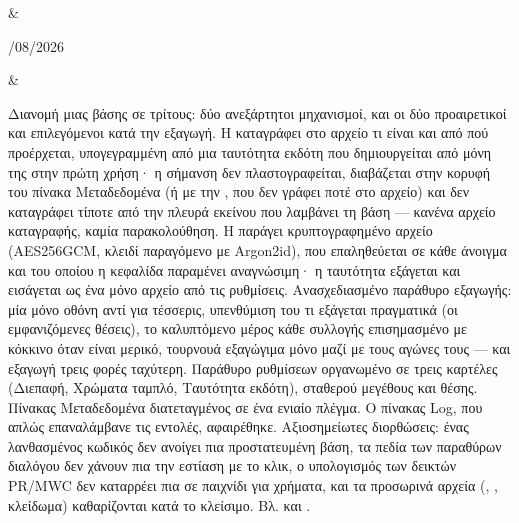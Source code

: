 \documentclass[letterpaper,10pt,greek]{sphinxmanual}
\begin{document}
\begin{savenotes}
\begin{longtable}{}
&\begin{varwidth}[t]{}
/08/2026
\sphinxbeforeendvarwidth
\end{varwidth}%
&\begin{varwidth}[t]{}
\sphinxAtStartPar
Διανομή μιας βάσης σε τρίτους: δύο ανεξάρτητοι μηχανισμοί, και οι δύο προαιρετικοί και επιλεγόμενοι κατά την εξαγωγή. Η  καταγράφει στο αρχείο τι είναι και από πού προέρχεται, υπογεγραμμένη από μια ταυτότητα εκδότη που δημιουργείται από μόνη της στην πρώτη χρήση· η σήμανση δεν πλαστογραφείται, διαβάζεται στην κορυφή του πίνακα Μεταδεδομένα (ή με την , που δεν γράφει ποτέ στο αρχείο) και δεν καταγράφει τίποτε από την πλευρά εκείνου που λαμβάνει τη βάση — κανένα αρχείο καταγραφής, καμία παρακολούθηση. Η  παράγει κρυπτογραφημένο αρχείο  (AES\sphinxhyphen{}256\sphinxhyphen{}GCM, κλειδί παραγόμενο με Argon2id), που επαληθεύεται σε κάθε άνοιγμα και του οποίου η κεφαλίδα παραμένει αναγνώσιμη· η ταυτότητα εξάγεται και εισάγεται ως ένα μόνο αρχείο από τις ρυθμίσεις. Ανασχεδιασμένο παράθυρο εξαγωγής: μία μόνο οθόνη αντί για τέσσερις, υπενθύμιση του τι εξάγεται πραγματικά (οι εμφανιζόμενες θέσεις), το καλυπτόμενο μέρος κάθε συλλογής επισημασμένο με κόκκινο όταν είναι μερικό, τουρνουά εξαγώγιμα μόνο μαζί με τους αγώνες τους — και εξαγωγή τρεις φορές ταχύτερη. Παράθυρο ρυθμίσεων οργανωμένο σε τρεις καρτέλες (Διεπαφή, Χρώματα ταμπλό, Ταυτότητα εκδότη), σταθερού μεγέθους και θέσης. Πίνακας Μεταδεδομένα διατεταγμένος σε ένα ενιαίο πλέγμα. Ο πίνακας Log, που απλώς επαναλάμβανε τις εντολές, αφαιρέθηκε. Αξιοσημείωτες διορθώσεις: ένας λανθασμένος κωδικός δεν ανοίγει πια προστατευμένη βάση, τα πεδία των παραθύρων διαλόγου δεν χάνουν πια την εστίαση με το κλικ, ο υπολογισμός των δεικτών PR/MWC δεν καταρρέει πια σε παιχνίδι για χρήματα, και τα προσωρινά αρχεία (, , κλείδωμα) καθαρίζονται κατά το κλείσιμο. Βλ. {\hyperref[\detokenize{manuel:diffusion-controlee}]{}} και {\hyperref[\detokenize{manuel:manuel}]{}}.
\sphinxbeforeendvarwidth
\end{varwidth}%
\\
\sphinxhline\begin{varwidth}[t]{}

\end{varwidth}
\end{longtable}
\end{savenotes}
\end{document}
